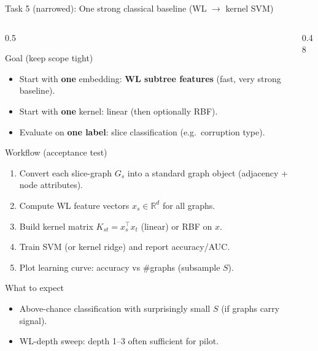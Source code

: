 \documentclass[aspectratio=169,xcolor={dvipsnames}]{beamer}
\renewcommand{\accent}[1]{\textbf{#1}}
\newcommand{\R}{\mathbb{R}}
\begin{document}
\begin{frame}[fragile,shrink=34]{Task 5 (narrowed): One strong classical baseline (WL $\rightarrow$ kernel SVM)}
\small
\begin{columns}[T,onlytextwidth]
\begin{column}{0.5\textwidth}
\begin{block}{Goal (keep scope tight)}
\begin{itemize}\setlength\itemsep{3pt}
\item Start with \accent{one} embedding: \accent{WL subtree features} (fast, very strong baseline).
\item Start with \accent{one} kernel: linear (then optionally RBF).
\item Evaluate on \accent{one label}: slice classification (e.g.\ corruption type).
\end{itemize}
\end{block}

\begin{block}{Workflow (acceptance test)}
\begin{enumerate}\setlength\itemsep{2pt}
\item Convert each slice-graph $G_s$ into a standard graph object (adjacency + node attributes).
\item Compute WL feature vectors $x_s\in\R^d$ for all graphs.
\item Build kernel matrix $K_{st}=x_s^\top x_t$ (linear) or RBF on $x$.
\item Train SVM (or kernel ridge) and report accuracy/AUC.
\item Plot learning curve: accuracy vs \#graphs (subsample $S$).
\end{enumerate}
\end{block}

\begin{block}{What to expect}
\begin{itemize}\setlength\itemsep{2pt}
\item Above-chance classification with surprisingly small $S$ (if graphs carry signal).
\item WL-depth sweep: depth 1--3 often sufficient for pilot.
\end{itemize}
\end{block}

\end{column}

\begin{column}{0.48\textwidth}


\end{column}
\end{columns}
\end{frame}
\end{document}
